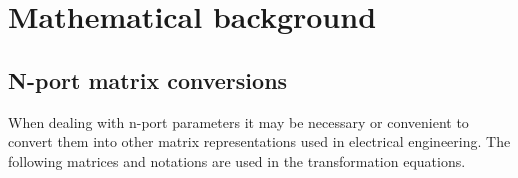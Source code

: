 %
%
%
%

\chapter{Mathematical background}

\section{N-port matrix conversions}
\label{sec:SparameterConversion}

When dealing with n-port parameters it may be necessary or
convenient to convert them into
other matrix representations used in electrical engineering.
The following matrices and notations are used in the
transformation equations.

\addvspace{12pt}

